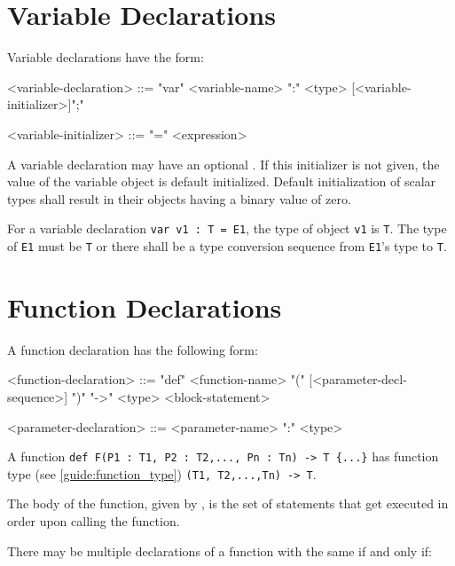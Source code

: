 \section{Variable Declarations} \label{guide:variables}

Variable declarations have the form:

\begin{minip}
\begin{grammar}
<variable-declaration> ::=
"var" <variable-name> ":" <type> [<variable-initializer>]";"

<variable-initializer> ::= "=" <expression>
\end{grammar}
\end{minip}

A variable declaration may have an optional . If this initializer is not given, the value of the variable object is default initialized. Default initialization of scalar types shall result in their objects having a binary value of zero.

For a variable declaration \texttt{var v1 : T = E1}, the type of object \texttt{v1} is \texttt{T}. The type of \texttt{E1} must be \texttt{T} or there shall be a type conversion sequence from \texttt{E1}'s type to \texttt{T}. 

\section{Function Declarations} \label{guide:function}

A function declaration has the following form:

\begin{minip}
\begin{grammar}
<function-declaration> ::=
"def" <function-name> "(" [<parameter-decl-sequence>] ")" "->" <type> <block-statement>

<parameter-declaration> ::= <parameter-name> ":" <type>
\end{grammar}
\end{minip}

A function \texttt{def F(P1 : T1, P2 : T2,..., Pn : Tn) -> T \{...\}} has function type (see \ref{guide:function_type}) \texttt{(T1, T2,...,Tn) -> T}.

The body of the function, given by , is the set of statements that get executed in order upon calling the function.

There may be multiple declarations of a function with the same  if and only if:

